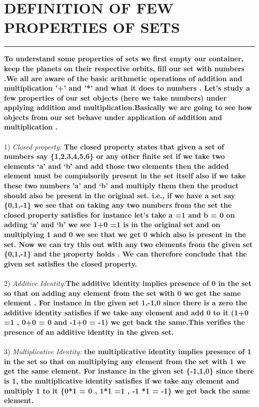 \documentclass{article}
\begin{document}
\section * {DEFINITION OF FEW PROPERTIES OF SETS }
\hrule 
\bigskip
\textbf{To understand some properties of sets we first empty our container, keep the planets on their respective orbits, fill our set with numbers .We all are aware of the basic arithmetic operations of addition and multiplication '+' and '*' and what it does to numbers . Let's study a few properties of our set objects (here we take numbers) under applying addition and multiplication.Basically we are going to see how objects from our set behave under application of addition and multiplication .}
\\
\\
1) \textit{Closed property:\quad}\textbf{ The closed property states that given a set of numbers say \{1,2,3,4,5,6\} or any other finite set  if we take two elements ‘a’ and ‘b’ and add those two elements then the added element must be compulsorily present in the set itself also if we take these two numbers ’a’ and ‘b’ and multiply them then the product should also be present in the original set.  i.e., if we have a set  say \{0,1,-1\} we see that on taking any two numbers from the set the closed property satisfies for instance let’s take a =1 and b = 0 on adding ‘a’ and ‘b’ we see 1+0 =1 is in the original set and on multiplying 1 and 0 we see that we get 0 which also is present in the set. Now we can try this out with any two elements from the given set \{0,1,-1\} and the property holds . We can therefore conclude that the given set satisfies the closed property.
}
\\
\\
2) \textit{Additive Identity:\quad}\textbf{The additive identity implies presence of 0 in the set  so that on adding any element from the set with 0 we get the same element . For instance in the given set {1,-1,0} since there is a zero the additive identity satisfies if we take any element and add 0 to it (1+0 =1 , 0+0 = 0 and -1+0 = -1) we get back the same.This verifies the presence of  an additive identity in the given set.}
\\
\\
3) \textit{Multiplicative Identity:\quad }\textbf{
 the multiplicative identity implies presence of 1 in the set so that on multiplying any element from the set with 1 we get the same element. For instance in the given set \{-1,1,0\} since there is 1, the multiplicative identity satisfies if we take any element and multiply 1 to it \{0*1 = 0 , 1*1 =1 , -1 *1 = -1\} we get back the same element.
}
\pagebreak
\end{document}
